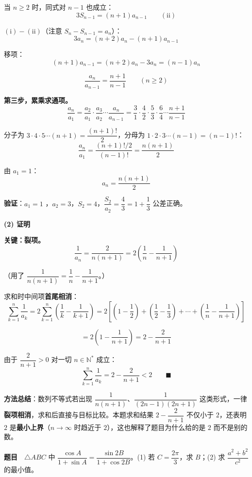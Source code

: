 当 $n\ge2$ 时，同式对 $n-1$ 也成立：
\[3S_{n-1}=(n+1)a_{n-1}\qquad(\text{ii})\]

$(\text{i})-(\text{ii})$（注意 $S_n-S_{n-1}=a_n$）：
\[3a_n=(n+2)a_n-(n+1)a_{n-1}\]

移项：
\[(n+1)a_{n-1}=(n+2)a_n-3a_n=(n-1)a_n\]

\[\frac{a_n}{a_{n-1}}=\frac{n+1}{n-1}\qquad(n\ge2)\]

\textbf{第三步，累乘求通项。}
\[\frac{a_n}{a_1}=\frac{a_2}{a_1}\cdot\frac{a_3}{a_2}\cdots\frac{a_n}{a_{n-1}}=\frac31\cdot\frac42\cdot\frac53\cdot\frac64\cdots\frac{n+1}{n-1}\]

分子为 $3\cdot4\cdot5\cdots(n+1)=\dfrac{(n+1)!}{2}$，分母为 $1\cdot2\cdot3\cdots(n-1)=(n-1)!$：
\[\frac{a_n}{a_1}=\frac{(n+1)!/2}{(n-1)!}=\frac{n(n+1)}2\]

由 $a_1=1$：
\[a_n=\frac{n(n+1)}2\]

\textbf{验证}：$a_1=1$ ，$a_2=3$，$S_2=4$，$\dfrac{S_2}{a_2}=\dfrac43=1+\dfrac13$  公差正确。

\par\medskip

\textbf{(2) 证明}

\textbf{关键：裂项。}
\[\frac1{a_n}=\frac2{n(n+1)}=2\left(\frac1n-\frac1{n+1}\right)\]

（用了 $\dfrac1{n(n+1)}=\dfrac1n-\dfrac1{n+1}$。）

求和时中间项\textbf{首尾相消}：
\[\sum_{k=1}^n\frac1{a_k}=2\sum_{k=1}^n\left(\frac1k-\frac1{k+1}\right)=2\left[\left(1-\frac12\right)+\left(\frac12-\frac13\right)+\cdots+\left(\frac1n-\frac1{n+1}\right)\right]\]

\[=2\left(1-\frac1{n+1}\right)=2-\frac2{n+1}\]

由于 $\dfrac2{n+1}>0$ 对一切 $n\in\mathbb N^{*}$ 成立：
\[\sum_{k=1}^n\frac1{a_k}=2-\frac2{n+1}<2\qquad\blacksquare\]

\begin{gktip}
\textbf{方法总结}：数列不等式若出现 $\dfrac1{n(n+1)}$、$\dfrac1{(2n-1)(2n+1)}$ 这类形式，一律\textbf{裂项相消}，求和后直接与目标比较。本题求和结果 $2-\dfrac2{n+1}$ 不仅小于 $2$，还表明 $2$ 是\textbf{最小上界}（$n\to\infty$ 时趋近于 $2$），这也解释了题目为什么给的是 $2$ 而不是别的数。
\end{gktip}

\par\medskip


\textbf{题目}　$\triangle ABC$ 中 $\dfrac{\cos A}{1+\sin A}=\dfrac{\sin2B}{1+\cos2B}$。(1) 若 $C=\dfrac{2\pi}3$，求 $B$；(2) 求 $\dfrac{a^{2}+b^{2}}{c^{2}}$ 的最小值。

